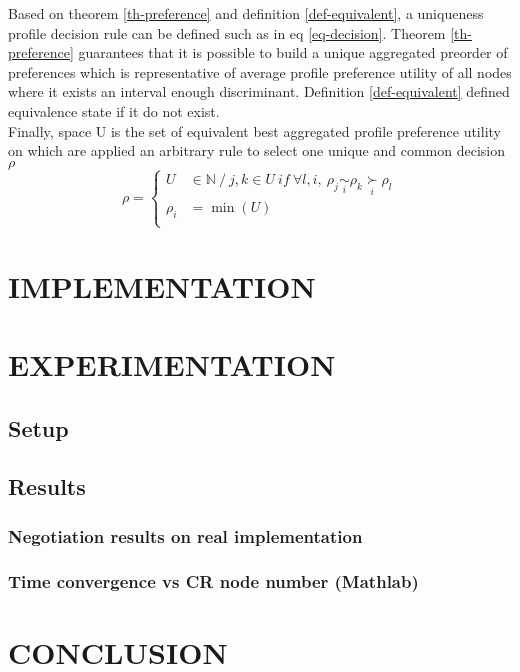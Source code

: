 \documentclass[10pt,twocolumn]{article}
\newcommand{\preferal}[1]{\underset{#1}{\succ}}
\newcommand{\equivalent}[1]{\underset{#1}{\sim}}
\begin{document}
Based on theorem \ref{th-preference} and definition \ref{def-equivalent}, a uniqueness profile decision rule can be defined such as in eq \ref{eq-decision}. Theorem \ref{th-preference} guarantees that it is possible to build a unique aggregated preorder of preferences which is representative of average profile preference utility of all nodes where it exists an interval enough discriminant. Definition \ref{def-equivalent} defined equivalence state if it do not exist.\\

Finally, space U is the set of equivalent best aggregated profile preference utility on which are applied an arbitrary rule to select one unique and common decision $\rho$
\begin{equation}
\label{eq-decision}
\rho = \left\{
      \begin{aligned}
      U &\in \mathbb{N} \ / \ j,k \in U \ if \ \forall l,i, \ \rho_j \equivalent{i} \rho_k \preferal{i} \rho_l \\
     \rho_i &= \min(U)\\
      \end{aligned}
    \right.
\end{equation}

\section{IMPLEMENTATION}

\section{EXPERIMENTATION}
\subsection{Setup}

\subsection{Results}

\subsubsection{Negotiation results on real implementation}

\subsubsection{Time convergence vs CR node number (Mathlab)}

\section{CONCLUSION}
\end{document}

